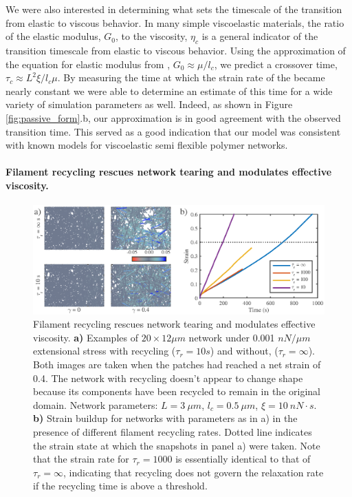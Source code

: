 \documentclass[10pt,letterpaper]{article}
\begin{document}
We were also interested in determining what sets the timescale of the transition from elastic to viscous behavior.  In many simple viscoelastic materials, the ratio of the elastic modulus, $G_0$, to the viscosity, $\eta_c$ is a general indicator of the transition timescale from elastic to viscous behavior.  Using the approximation of the equation for elastic modulus from \cite{theo_hlm}, $G_0 \approx \mu/l_c$, we predict a crossover time, $\tau_c \approx L^2\xi/l_c\mu$.  By measuring the time at which the strain rate of the became nearly constant we were able to determine an estimate of this time for a wide variety of simulation parameters as well.  Indeed, as shown in Figure \ref{fig:passive_form}.b, our approximation is in good agreement with the observed transition time.  This served as a good indication that our model was consistent with known models for viscoelastic semi flexible polymer networks.




\paragraph{Filament recycling rescues network tearing and modulates effective viscosity.}





\begin{figure}[h!]
\centering
\includegraphics[width=\hsize]{figures/figure5a}
\caption{\label{fig:passive_rec}  Filament recycling rescues network tearing and modulates effective viscosity.  \textbf{a)} Examples of $20 \times 12 \mu m$ network under 0.001 $nN/\mu m$ extensional stress with recycling ($\tau_r=10 s$) and without, ($\tau_r=\infty$).  Both images are taken when the patches had reached a net strain of 0.4.  The network with recycling doesn't appear to change shape because its components have been recycled to remain in the original domain.  Network parameters: $L=3\: \mu m$, $l_c=0.5\: \mu m$, $\xi=10\: nN\cdot s$.  \textbf{b)}  Strain buildup for networks with parameters as in a) in the presence of different filament recycling rates. Dotted line indicates the strain state at which the snapshots in panel a) were taken.  Note that the strain rate for $\tau_r=1000$ is essentially identical to that of $\tau_r=\infty$, indicating that recycling does not govern the relaxation rate if the recycling time is above a threshold.}
\end{figure}
\end{document}
